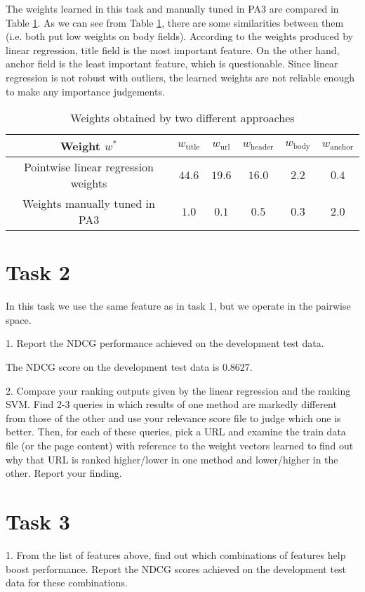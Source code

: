The weights learned in this task and manually tuned in PA3 are compared in Table \ref{tab:wt}.
As we can see from Table \ref{tab:wt}, there are some similarities between them (i.e. both put low weights on body fields).
According to the weights produced by linear regression, title field is the most important feature. On the other hand,
anchor field is the least important feature, which is questionable. Since linear regression is not robust with outliers,
the learned weights are not reliable enough to make any importance judgements.
\begin{table}
\begin{center}
\begin{tabular}{|c|c|c|c|c|c|}
  \hline
  Weight $w^*$ & $w_\textrm{title}$ & $w_\textrm{url}$ & $w_\textrm{header}$ & $w_\textrm{body}$ & $w_\textrm{anchor}$ \\
  \hline
  Pointwise linear regression weights & $44.6$ & $19.6$ & $16.0$ & $2.2$ & $0.4$ \\
  \hline
  Weights manually tuned in PA3 & $1.0$ & $0.1$ & $0.5$ & $0.3$ & $2.0$ \\
  \hline
\end{tabular}
\caption{Weights obtained by two different approaches}\label{tab:wt}
\end{center}
\end{table}


\section{Task 2}
In this task we use the same feature as in task 1, but we operate in the pairwise space.

1. Report the NDCG performance achieved on the development test data.

The NDCG score on the development test data is $0.8627$.


2. Compare your ranking outputs given by the linear regression and the ranking SVM.
Find 2-3 queries in which results of one method are markedly different from those
of the other and use your relevance score file to judge which one is better.
Then, for each of these queries, pick a URL and examine the train data file (or the
page content) with reference to the weight vectors learned to find out why that
URL is ranked higher/lower in one method and lower/higher in the other. Report
your finding.



\section{Task 3}
1. From the list of features above, find out which combinations of features help boost
performance. Report the NDCG scores achieved on the development test data
for these combinations.

